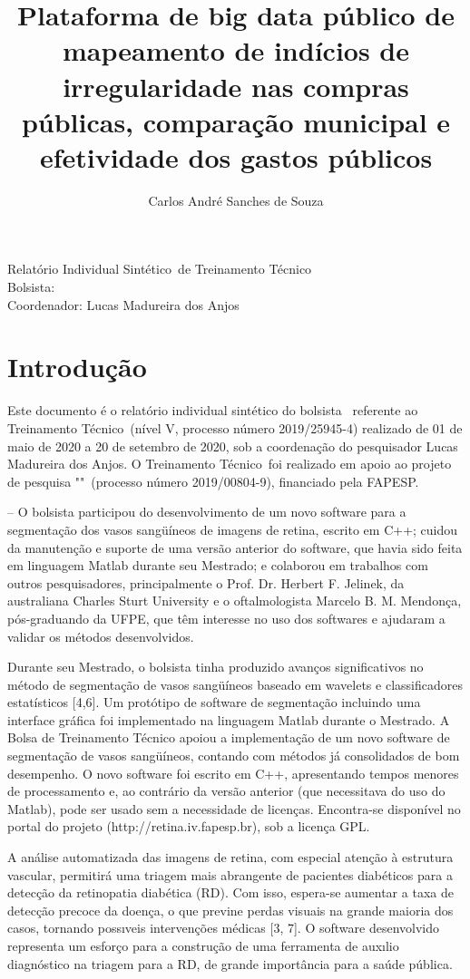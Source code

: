 \documentclass[12pt]{report}
\title{Plataforma de big data público de mapeamento de indícios de irregularidade nas compras públicas, comparação municipal e efetividade dos gastos públicos}
\author{Carlos André Sanches de Souza}
\makeatletter
\let\titulo\@title
\let\autor\@author
\newcommand{\responsavel}{Lucas Madureira dos Anjos}
\newcommand{\fomentoSigla}{FAPESP}
\newcommand{\relatorio}{Relatório Individual Sintético}
\newcommand{\projetoModalidade}{Treinamento Técnico}
\newcommand{\projetoNivel}{V}
\newcommand{\projetoNumero}{2019/25945-4}
\newcommand{\projetoVinculado}{2019/00804-9}
\newcommand{\periodoRelatorio}{01 de maio de 2020 a 20 de setembro de 2020}
\def\maketitle{
	\begin{center}
		{\Large \relatorio\ de \projetoModalidade}\\[0.5cm]
		{\large Bolsista: \autor}\\
		{\large Coordenador: \responsavel}
	\end{center}
}
\makeatother
\begin{document}
\maketitle

\chapter{Introdução}
\label{chp:introducao} 
Este documento é o relatório individual sintético do bolsista \autor\ referente ao \projetoModalidade\ (nível \projetoNivel , processo número \projetoNumero) realizado de \periodoRelatorio , sob a coordenação do pesquisador \responsavel. O \projetoModalidade\ foi realizado em apoio ao projeto de pesquisa "\titulo"\ (processo número \projetoVinculado), financiado pela \fomentoSigla.

-- O bolsista participou do desenvolvimento de um novo software para a segmentação dos vasos sangüíneos de imagens de retina, escrito em C++; cuidou da manutenção e suporte de uma versão anterior do software, que havia sido feita em linguagem Matlab durante seu Mestrado; e colaborou em trabalhos com outros pesquisadores, principalmente o Prof. Dr. Herbert F. Jelinek, da australiana Charles Sturt University e o oftalmologista Marcelo B. M. Mendonça, pós-graduando da UFPE, que têm interesse no uso dos softwares e ajudaram a validar os métodos desenvolvidos.

Durante seu Mestrado, o bolsista tinha produzido avanços significativos no método de segmentação de vasos sangüíneos baseado em wavelets e classificadores estatísticos [4,6]. Um protótipo de software de segmentação incluindo uma interface gráfica foi implementado na linguagem Matlab durante o Mestrado. A Bolsa de Treinamento Técnico apoiou a implementação de um novo software de segmentação de vasos sangüíneos, contando com métodos já consolidados de bom desempenho. O novo software foi escrito em C++, apresentando tempos menores de processamento e, ao contrário da versão anterior (que necessitava do uso do Matlab), pode ser usado sem a necessidade de licenças. Encontra-se disponível no portal do projeto (http://retina.iv.fapesp.br), sob a licença GPL.

A análise automatizada das imagens de retina, com especial atenção à estrutura vascular, permitirá uma triagem mais abrangente de pacientes diabéticos para a detecção da retinopatia diabética (RD). Com isso, espera-se aumentar a taxa de detecção precoce da doença, o que previne perdas visuais na grande maioria dos casos, tornando possıveis intervenções médicas [3, 7]. O software desenvolvido representa um esforço para a construção de uma ferramenta de auxılio diagnóstico na triagem para a RD, de grande importância para a saúde pública.
\end{document}
